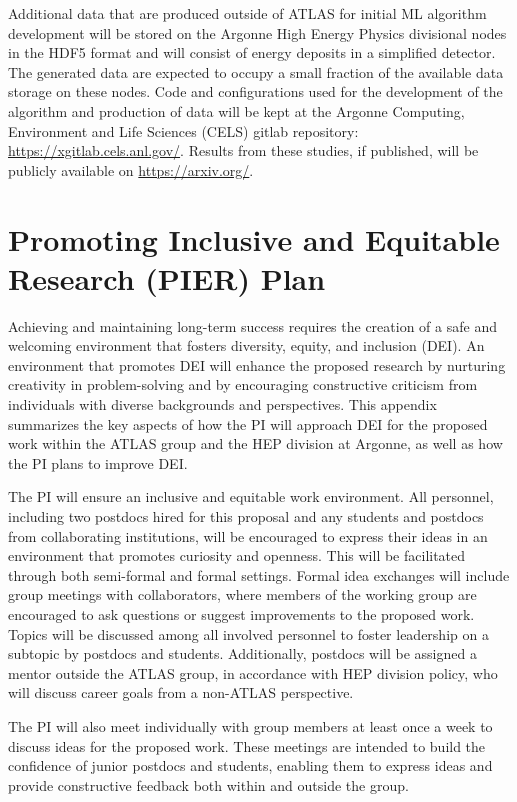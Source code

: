 \documentclass[letter, USenglish, 11pt, subfigure]{article}
\begin{document}
Additional data that are produced outside of ATLAS for initial ML algorithm development will be stored on the Argonne High Energy Physics divisional nodes in the HDF5 format and will consist of energy deposits in a simplified detector. The generated data are expected to occupy a small fraction of the available data storage on these nodes. Code and configurations used for the development of the algorithm and production of data will be kept at the Argonne Computing, Environment and Life Sciences (CELS) gitlab repository: \url{https://xgitlab.cels.anl.gov/}. Results from these studies, if published, will be publicly available on \url{https://arxiv.org/}. 

\clearpage

\section{Promoting Inclusive and Equitable Research (PIER) Plan}

Achieving and maintaining long-term success requires the creation of a safe and welcoming environment that fosters diversity, equity, and inclusion (DEI). An environment that promotes DEI will enhance the proposed research by nurturing creativity in problem-solving and by encouraging constructive criticism from individuals with diverse backgrounds and perspectives. This appendix summarizes the key aspects of how the PI will approach DEI for the proposed work within the ATLAS group and the HEP division at Argonne, as well as how the PI plans to improve DEI.

The PI will ensure an inclusive and equitable work environment. All personnel, including two postdocs hired for this proposal and any students and postdocs from collaborating institutions, will be encouraged to express their ideas in an environment that promotes curiosity and openness. This will be facilitated through both semi-formal and formal settings. Formal idea exchanges will include group meetings with collaborators, where members of the working group are encouraged to ask questions or suggest improvements to the proposed work. Topics will be discussed among all involved personnel to foster leadership on a subtopic by postdocs and students. Additionally, postdocs will be assigned a mentor outside the ATLAS group, in accordance with HEP division policy, who will discuss career goals from a non-ATLAS perspective.

The PI will also meet individually with group members at least once a week to discuss ideas for the proposed work. These meetings are intended to build the confidence of junior postdocs and students, enabling them to express ideas and provide constructive feedback both within and outside the group.
\end{document}
